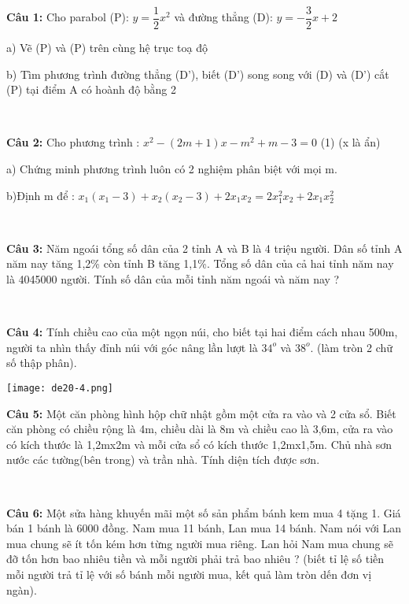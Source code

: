 \documentclass[12pt]{article}
\begin{document}
\textbf{Câu 1:} Cho parabol (P): $y = \dfrac{1}{2}x^2$ và đường thẳng (D): $y = -\dfrac{3}{2}x + 2$ \par
a) Vẽ (P) và (P) trên cùng hệ trục toạ độ \par
b) Tìm phương trình đường thẳng (D'), biết (D') song song với (D) và (D') cắt (P) tại điểm A có hoành độ bằng 2 \par

\   

\textbf{Câu 2:} Cho phương trình : $x^2 - (2m + 1)x - m^2 + m - 3 = 0$ (1) (x là ẩn) \par
a) Chứng minh phương trình luôn có 2 nghiệm phân biệt với mọi m. \par
b)Định m để : $x_1(x_1-3) + x_2(x_2 - 3) + 2x_1x_2 = 2x_1^2x_2 + 2x_1x_2^2$ \par

\   

\textbf{Câu 3:} Năm ngoái tổng số dân của 2 tỉnh A và B là 4 triệu người. Dân số tỉnh A năm nay tăng 1,2\% còn tỉnh B tăng 1,1\%. Tổng số dân của cả hai tỉnh năm nay là 4045000 người. Tính số dân của mỗi tỉnh năm ngoái và năm nay ? \par

\   

\textbf{Câu 4:} Tính chiều cao của một ngọn núi, cho biết tại hai điểm cách nhau 500m, người ta nhìn thấy đỉnh núi với góc nâng lần lượt là $34^o$ và $38^o$. (làm tròn 2 chữ số thập phân). \par

\begin{center}
    \texttt{[image: de20-4.png]}
\end{center}

\textbf{Câu 5:} Một căn phòng hình hộp chữ nhật gồm một cửa ra vào và 2 cửa sổ. Biết căn phòng có chiều rộng là 4m, chiều dài là 8m và chiều cao là 3,6m, cửa ra vào có kích thước là 1,2mx2m và mỗi cửa sổ có kích thước 1,2mx1,5m. Chủ nhà sơn nước các tường(bên trong) và trần nhà. Tính diện tích được sơn. \par

\   

\textbf{Câu 6:} Một sửa hàng khuyến mãi một số sản phẩm bánh kem mua 4 tặng 1. Giá bán 1 bánh là 6000 đồng. Nam mua 11 bánh, Lan mua 14 bánh. Nam nói với Lan mua chung sẽ ít tốn kém hơn từng người mua riêng. Lan hỏi Nam mua chung sẽ đỡ tốn hơn bao nhiêu tiền và mỗi người phải trả bao nhiêu ? (biết tỉ lệ số tiền mỗi người trả tỉ lệ với số bánh mỗi người mua, kết quả làm tròn dến đơn vị ngàn). \par
\end{document}
